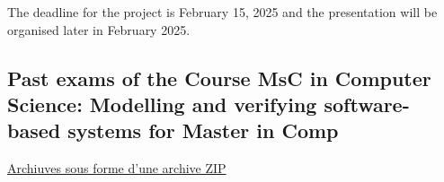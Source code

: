 \documentclass[ 12pt]{article}
\begin{document}
The deadline for the project is  February 15, 2025 and the presentation
will be  organised later in February 2025. 



\subsection{Past exams  of  the  Course MsC in Computer Science: Modelling and verifying software-based systems for Master in Comp}
\label{sec:past-exams-course}


\href{http://mery54.github.io/teaching/mosos/lecturesnotes/annales-master2425.zip}{Archiuves
sous forme d'une archive ZIP}






\end{document}
